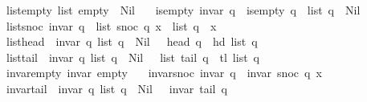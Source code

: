 \begin{isabellebody}
\ \ \ list{\isacharunderscore}{\kern0pt}empty{\isacharcolon}{\kern0pt}\ {\isachardoublequoteopen}list\ empty\ {\isacharequal}{\kern0pt}\ Nil{\isachardoublequoteclose}\isanewline
\ \ \ is{\isacharunderscore}{\kern0pt}empty{\isacharcolon}{\kern0pt}\ {\isachardoublequoteopen}invar\ q\ {\isasymLongrightarrow}\ is{\isacharunderscore}{\kern0pt}empty\ q\ {\isacharequal}{\kern0pt}\ {\isacharparenleft}{\kern0pt}list\ q\ {\isacharequal}{\kern0pt}\ Nil{\isacharparenright}{\kern0pt}{\isachardoublequoteclose}\isanewline
\ \ \ list{\isacharunderscore}{\kern0pt}snoc{\isacharcolon}{\kern0pt}\ {\isachardoublequoteopen}invar\ q\ {\isasymLongrightarrow}\ list\ {\isacharparenleft}{\kern0pt}snoc\ q\ x{\isacharparenright}{\kern0pt}\ {\isacharequal}{\kern0pt}\ list\ q\ {\isacharat}{\kern0pt}\ {\isacharbrackleft}{\kern0pt}x{\isacharbrackright}{\kern0pt}{\isachardoublequoteclose}\isanewline
\ \ \ list{\isacharunderscore}{\kern0pt}head{\isacharcolon}{\kern0pt}\ {\isachardoublequoteopen}{\isasymlbrakk}\ invar\ q{\isacharsemicolon}{\kern0pt}\ list\ q\ {\isasymnoteq}\ Nil\ {\isasymrbrakk}\ {\isasymLongrightarrow}\ head\ q\ {\isacharequal}{\kern0pt}\ hd\ {\isacharparenleft}{\kern0pt}list\ q{\isacharparenright}{\kern0pt}{\isachardoublequoteclose}\isanewline
\ \ \ list{\isacharunderscore}{\kern0pt}tail{\isacharcolon}{\kern0pt}\ {\isachardoublequoteopen}{\isasymlbrakk}\ invar\ q{\isacharsemicolon}{\kern0pt}\ list\ q\ {\isasymnoteq}\ Nil\ {\isasymrbrakk}\ {\isasymLongrightarrow}\ list\ {\isacharparenleft}{\kern0pt}tail\ q{\isacharparenright}{\kern0pt}\ {\isacharequal}{\kern0pt}\ tl\ {\isacharparenleft}{\kern0pt}list\ q{\isacharparenright}{\kern0pt}{\isachardoublequoteclose}\isanewline
\ \ \ invar{\isacharunderscore}{\kern0pt}empty{\isacharcolon}{\kern0pt}\ {\isachardoublequoteopen}invar\ empty{\isachardoublequoteclose}\isanewline
\ \ \ invar{\isacharunderscore}{\kern0pt}snoc{\isacharcolon}{\kern0pt}\ {\isachardoublequoteopen}invar\ q\ {\isasymLongrightarrow}\ invar\ {\isacharparenleft}{\kern0pt}snoc\ q\ x{\isacharparenright}{\kern0pt}{\isachardoublequoteclose}\isanewline
\ \ \ invar{\isacharunderscore}{\kern0pt}tail{\isacharcolon}{\kern0pt}\ {\isachardoublequoteopen}{\isasymlbrakk}\ invar\ q{\isacharsemicolon}{\kern0pt}\ list\ q\ {\isasymnoteq}\ Nil\ {\isasymrbrakk}\ {\isasymLongrightarrow}\ invar\ {\isacharparenleft}{\kern0pt}tail\ q{\isacharparenright}{\kern0pt}{\isachardoublequoteclose}\isanewline
%
\isadeliminvisible
\isanewline

\end{isabellebody}
